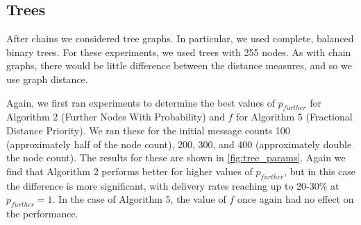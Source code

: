 \documentclass[bsc,frontabs,twoside,singlespacing,parskip,deptreport]{infthesis}     %
\begin{document}
\subsection{Trees}
After chains we considered tree graphs. In particular, we used complete, balanced binary trees. For these experiments, we used trees with 255 nodes. As with chain graphs, there would be little difference between the distance measures, and so we use graph distance.

Again, we first ran experiments to determine the best values of $p_{further}$ for Algorithm 2 (Further Nodes With Probability) and $f$ for Algorithm 5 (Fractional Distance Priority). We ran these for the initial message counts 100 (approximately half of the node count), 200, 300, and 400 (approximately double the node count). The results for these are shown in \ref{fig:tree_params}. Again we find that Algorithm 2 performs better for higher values of $p_{further}$, but in this case the difference is more significant, with delivery rates reaching up to 20-30\% at $p_{further}=1$. In the case of Algorithm 5, the value of $f$ once again had no effect on the performance.
\end{document}
